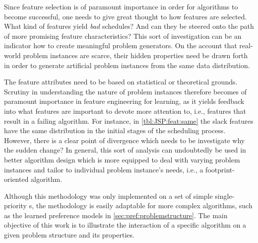 Since feature selection is of paramount importance in order for algorithms to 
become successful, one needs to give great thought to how features are 
selected. What kind of features yield \emph{bad} schedules? And can they be 
steered onto the path of more promising feature characteristics? This sort of 
investigation can be an indicator how to create meaningful problem generators. 
On the account that real-world problem instances are scarce, their hidden 
properties need be drawn forth in order to generate artificial problem 
instances from the same data distribution. 

The feature attributes need to be based on statistical or theoretical grounds. 
Scrutiny in understanding the nature of problem instances therefore becomes of 
paramount importance in feature engineering for learning, as it yields feedback 
into what features are important to devote more attention to, i.e., features 
that result in a failing algorithm. 
For instance, in \cref{tbl:JSP:feat:same} the slack features have the same 
distribution in the initial stages of the scheduling process. However, there is 
a clear point of divergence which needs to be investigate why the sudden 
change? 
In general, this sort of analysis can undoubtedly be used in better 
algorithm design which is more equipped to deal with varying problem instances 
and tailor to individual problem instance's needs, i.e., a footprint-oriented 
algorithm.

Although this methodology was only implemented on a set of simple 
single-priority \dr s, the methodology is easily adaptable for more 
complex algorithms, such as the learned preference models in 
\cref{sec:pref:problemstructure}. The main objective of this work is to 
illustrate the interaction of a specific algorithm on a given problem structure 
and its properties. 